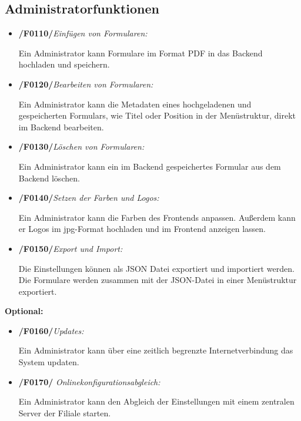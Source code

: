 \subsection{Administratorfunktionen}

    \begin{itemize}
        \item \textbf{/F0110/}\textit{Einfügen von Formularen:} \par
        Ein Administrator kann Formulare im Format PDF in das Backend hochladen und speichern.
        
        \item \textbf{/F0120/}\textit{Bearbeiten von Formularen:} \par
        Ein Administrator kann die Metadaten eines hochgeladenen und gespeicherten Formulars, wie Titel oder Position in der Menüstruktur, direkt im Backend bearbeiten.
        
        \item \textbf{/F0130/}\textit{Löschen von Formularen:} \par
        Ein Administrator kann ein im Backend gespeichertes Formular aus dem Backend löschen.
        
        \item \textbf{/F0140/}\textit{Setzen der Farben und Logos:} \par 
        Ein Administrator kann die Farben des Frontends anpassen. Außerdem kann er Logos im jpg-Format hochladen und im Frontend anzeigen lassen.
        
        \item \textbf{/F0150/}\textit{Export und Import:} \par
        Die Einstellungen können als JSON Datei exportiert und importiert werden. Die Formulare werden zusammen mit der JSON-Datei in einer Menüstruktur exportiert.
    \end{itemize}{}
\vspace{1,5cm}
\textbf{Optional:}
    \begin{itemize}
        \item \textbf{/F0160/}\textit{Updates:} \par 
        Ein Administrator kann über eine zeitlich begrenzte Internetverbindung das System updaten.
        
        \item \textbf{/F0170/} \textit{Onlinekonfigurationsabgleich:} \par
        Ein Administrator kann den Abgleich der Einstellungen mit einem zentralen Server der Filiale starten.
    \end{itemize}
    
